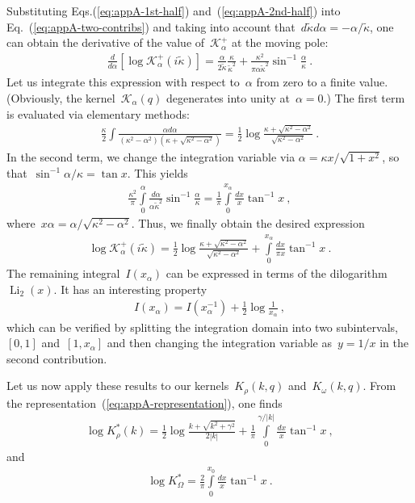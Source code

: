 \documentclass[preprint,aps,eqsecnum]{revtex4-1}
\newcommand{\fplus}[1]{{#1}^{+}}
\begin{document}
Substituting Eqs.(\ref{eq:appA-1st-half}) and~(\ref{eq:appA-2nd-half})
into Eq.~(\ref{eq:appA-two-contribs}) and taking into account
that~$d{\tilde \kappa}{d\alpha} =  - \alpha/{\tilde\kappa}$,
one can obtain the derivative of the value of~$\fplus{\mathcal{K}}_\alpha$
at the moving pole:
\begin{align}
  \frac{d}{d\alpha} [\log \fplus{\mathcal{K}}_\alpha(i{\tilde \kappa})] =
  \frac{\alpha}{2{\tilde\kappa}} \frac{\kappa}{{\tilde\kappa}^2}
  + \frac{\kappa^2}{\pi\alpha{\tilde\kappa}^2} \sin^{-1}\frac{\alpha}{\kappa}
  \ .
\end{align}
Let us integrate this expression with respect to~$\alpha$
from zero to a finite value. (Obviously, the kernel~$\mathcal{K}_\alpha(q)$
degenerates into unity at~$\alpha = 0$.)
The first term is evaluated via elementary methods:
\begin{align}
  \frac{\kappa}{2} \int \frac{\alpha d\alpha}{(\kappa^2 - \alpha^2)
  (\kappa + \sqrt{\kappa^2 - \alpha^2})}
  = \frac{1}{2} \log\frac{\kappa + \sqrt{\kappa^2 - \alpha^2}}{
    \sqrt{\kappa^2 - \alpha^2}}\ .
\end{align}
In the second term, we change the integration variable via
$\alpha = \kappa x / \sqrt{1 + x^2}$,
so that~$\sin^{-1} \alpha/\kappa = \tan x$. This yields
\begin{align}
  \frac{\kappa^2}{\pi} \int\limits_{0}^{\alpha}
  \frac{d\alpha}{\alpha{\tilde\kappa}^2} \sin^{-1}\frac{\alpha}{\kappa}
  = \frac{1}{\pi} \int\limits_{0}^{x_\alpha} \frac{dx}{x} \tan^{-1} x\ ,
\end{align}
where~$x\alpha = \alpha/\sqrt{\kappa^2 - \alpha^2}$.
Thus, we finally obtain the desired expression
\begin{align}
  \log \fplus{\mathcal{K}}_\alpha(i{\tilde \kappa})
  = \frac{1}{2}\log\frac{\kappa + \sqrt{\kappa^2 - \alpha^2}}{
  \sqrt{\kappa^2 - \alpha^2}}
  + \int\limits_{0}^{x_\alpha}\frac{dx}{\pi x} \tan^{-1} x\ .
\end{align}
The remaining integral~$I(x_\alpha)$
can be expressed in terms of the dilogarithm
$\mathop{\mathrm{Li}}_2(x)$. It has an interesting property
\begin{align}
I(x_\alpha) = I(x_\alpha^{-1}) + \frac{1}{2} \log\frac{1}{x_\alpha}\ ,
\end{align}
which can be verified by splitting the integration domain
into two subintervals,~$[0, 1]$ and~$[1, x_\alpha]$ and
then changing the integration variable as~$y = 1/x$ in the
second contribution.

Let us now apply these results to our kernels~$K_\rho(k, q)$
and~$K_\omega(k, q)$. From the representation~(\ref{eq:appA-representation}),
one finds
\begin{align}
  \log K_\rho^\ast(k) =  \frac{1}{2} \log\frac{k + \sqrt{k^2 + \gamma^2}}{2|k|}
  + \frac{1}{\pi}\int\limits_{0}^{\gamma/|k|}
  \frac{dx}{x} \tan^{-1}x
\ ,
\end{align}
and
\begin{align}
  \log K_\Omega^\ast =  \frac{2}{\pi}
  \int\limits_{0}^{x_0} \frac{dx}{x}\tan^{-1}x
\ .
\end{align}
\end{document}
